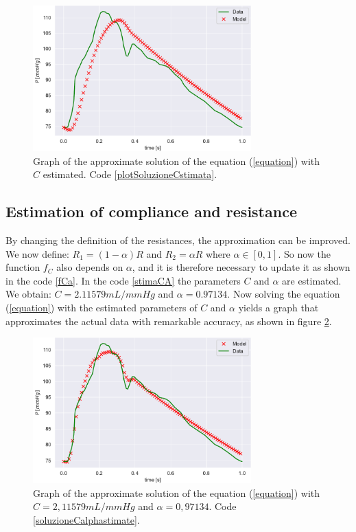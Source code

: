 \begin{figure}[h]
    \centering
    \includegraphics[width=0.75\textwidth]{images/Windkessel/modelloCstimata.pdf}
    \caption{Graph of the approximate solution of the equation (\ref{equation}) with $C$ estimated. Code \ref{plotSoluzioneCstimata}.}
    \label{soluzioneCapprossimata}
\end{figure}


\subsection{Estimation of compliance and resistance}\label{stimaCR}
By changing the definition of the resistances, the approximation can be improved. We now define: $R_1=(1-\alpha)R$ and $R_2=\alpha R$ where $\alpha\in[0,1]$. So now the function $f_C$ also depends on $\alpha$, and it is therefore necessary to update it as shown in the code \ref{fCa}.
In the code \ref{stimaCA} the parameters $C$ and $\alpha$ are estimated. We obtain: $C=2.11579 mL/mmHg$ and $\alpha=0.97134$.
Now solving the equation (\ref{equation}) with the estimated parameters of $C$ and $\alpha$ yields a graph that approximates the actual data with remarkable accuracy, as shown in figure \ref{soluzioneCalphaapprossimata}.

\begin{figure}[h]
    \centering
    \includegraphics[width=0.75\textwidth]{images/Windkessel/modelloCalphastimata.pdf}
    \caption{Graph of the approximate solution of the equation (\ref{equation}) with $C=2,11579mL/mmHg$ and $\alpha=0,97134$. Code \ref{soluzioneCalphastimate}.}
    \label{soluzioneCalphaapprossimata}
\end{figure}


